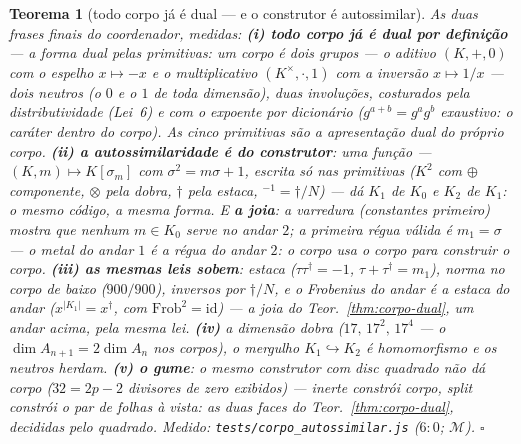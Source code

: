 \documentclass[11pt,a4paper]{article}
\newtheorem{teorema}{Teorema}
\newcommand{\code}[1]{\texttt{\small #1}}
\begin{document}
\begin{teorema}[todo corpo já é dual --- e o construtor é
autossimilar]\label{thm:autossimilar}
As duas frases finais do coordenador, medidas:
\textbf{(i) todo corpo já é dual por definição} --- a forma dual
pelas primitivas: um corpo é \emph{dois grupos} --- o aditivo
$(K,+,0)$ com o espelho $x\mapsto-x$ e o multiplicativo
$(K^{\times},\cdot,1)$ com a inversão $x\mapsto1/x$ --- dois neutros
(o $0$ e o $1$ de toda dimensão), duas involuções,
\emph{costurados} pela distributividade (Lei~6) e com o expoente por
dicionário ($g^{a+b}=g^{a}g^{b}$ exaustivo: o caráter \emph{dentro}
do corpo). As cinco primitivas são a apresentação dual do próprio
corpo.
\textbf{(ii) a autossimilaridade é do construtor}: \emph{uma} função
--- $(K,m)\mapsto K[\sigma_{m}]$ com $\sigma^{2}=m\sigma+1$, escrita
só nas primitivas ($K^{2}$ com $\oplus$ componente, $\otimes$ pela
dobra, $\dagger$ pela estaca, ${}^{-1}=\dagger/N$) --- dá $K_{1}$ de
$K_{0}$ e $K_{2}$ de $K_{1}$: o mesmo código, a mesma forma. E
\textbf{a joia}: a varredura (constantes primeiro) mostra que nenhum
$m\in K_{0}$ serve no andar $2$; a primeira régua válida é
$\boxed{m_{1}=\sigma}$ --- \emph{o metal do andar $1$ é a régua do
andar $2$}: o corpo usa o corpo para construir o corpo.
\textbf{(iii) as mesmas leis sobem}: estaca
($\tau\tau^{\dagger}=-1$, $\tau+\tau^{\dagger}=m_{1}$), norma no
corpo de baixo ($900/900$), inversos por $\dagger/N$, e o Frobenius
do andar \emph{é} a estaca do andar ($x^{|K_{1}|}=x^{\dagger}$, com
$\mathrm{Frob}^{2}=\mathrm{id}$) --- a joia do
Teor.~\ref{thm:corpo-dual}, um andar acima, pela mesma lei.
\textbf{(iv)} a dimensão dobra ($17,\,17^{2},\,17^{4}$ --- o
$\dim A_{n+1}=2\dim A_{n}$ nos corpos), o mergulho
$K_{1}\hookrightarrow K_{2}$ é homomorfismo e os neutros herdam.
\textbf{(v) o gume}: o mesmo construtor com disc \emph{quadrado} não
dá corpo ($32=2p-2$ divisores de zero exibidos) --- inerte constrói
corpo, split constrói o par de folhas à vista: as duas faces do
Teor.~\ref{thm:corpo-dual}, decididas pelo quadrado.
\emph{Medido:} \code{tests/corpo\_autossimilar.js} ($6{:}0$;
$\mathcal{M}$).
$\square$
\end{teorema}
\end{document}
